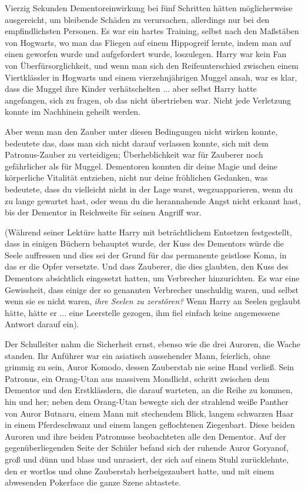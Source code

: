 Vierzig Sekunden Dementoreinwirkung bei fünf Schritten hätten möglicherweise
ausgereicht, um bleibende Schäden zu verursachen, allerdings nur bei den
empfindlichsten Personen. Es war ein hartes Training, selbst nach den Maßstäben
von Hogwarts, wo man das Fliegen auf einem Hippogreif lernte, indem man auf
einen geworfen wurde und aufgefordert wurde, loszulegen. Harry war kein Fan von
Überfürsorglichkeit, und wenn man sich den Reifeunterschied zwischen einem
Viertklässler in Hogwarts und einem vierzehnjährigen Muggel ansah, war es klar,
dass die Muggel ihre Kinder verhätschelten ... aber selbst Harry hatte
angefangen, sich zu fragen, ob das nicht übertrieben war. Nicht jede Verletzung
konnte im Nachhinein geheilt werden.

Aber wenn man den Zauber unter diesen Bedingungen nicht wirken konnte, bedeutete
das, dass man sich nicht darauf verlassen konnte, sich mit dem Patronus-Zauber
zu verteidigen; Überheblichkeit war für Zauberer noch gefährlicher als für
Muggel. Dementoren konnten dir deine Magie und deine körperliche Vitalität
entziehen, nicht nur deine fröhlichen Gedanken, was bedeutete, dass du
vielleicht nicht in der Lage warst, wegzuapparieren, wenn du zu lange gewartet
hast, oder wenn du die herannahende Angst nicht erkannt hast, bis der Dementor
in Reichweite für seinen Angriff war.

(Während seiner Lektüre hatte Harry mit beträchtlichem Entsetzen festgestellt,
dass in einigen Büchern behauptet wurde, der Kuss des Dementors würde die Seele
auffressen und dies sei der Grund für das permanente geistlose Koma, in das er
die Opfer versetzte. Und dass Zauberer, die dies glaubten, den Kuss des
Dementors absichtlich eingesetzt hatten, um Verbrecher hinzurichten. Es war eine
Gewissheit, dass einige der so genannten Verbrecher unschuldig waren, und selbst
wenn sie es nicht waren,\emph{ ihre Seelen zu zerstören?} Wenn Harry an Seelen
geglaubt hätte, hätte er ... eine Leerstelle gezogen, ihm fiel einfach keine
angemessene Antwort darauf ein).

Der Schulleiter nahm die Sicherheit ernst, ebenso wie die drei Auroren, die
Wache standen. Ihr Anführer war ein asiatisch aussehender Mann, feierlich, ohne
grimmig zu sein, Auror Komodo, dessen Zauberstab nie seine Hand verließ. Sein
Patronus, ein Orang-Utan aus massivem Mondlicht, schritt zwischen dem Dementor
und den Erstklässlern, die darauf warteten, an die Reihe zu kommen, hin und her;
neben dem Orang-Utan bewegte sich der strahlend weiße Panther von Auror Butnaru,
einem Mann mit stechendem Blick, langem schwarzen Haar in einem Pferdeschwanz
und einem langen geflochtenen Ziegenbart. Diese beiden Auroren und ihre beiden
Patronusse beobachteten alle den Dementor. Auf der gegenüberliegenden Seite der
Schüler befand sich der ruhende Auror Goryanof, groß und dünn und blass und
unrasiert, der sich auf einem Stuhl zurücklehnte, den er wortlos und ohne
Zauberstab herbeigezaubert hatte, und mit einem abwesenden Pokerface die ganze
Szene abtastete.

